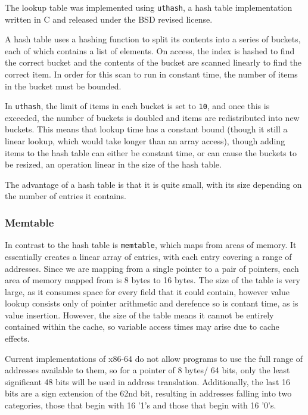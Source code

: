 The lookup table was implemented using \verb!uthash!, a hash table implementation written in C and released under the BSD revised license. 

A hash table uses a hashing function to split its contents into a series of buckets, each of which contains a list of elements.
On access, the index is hashed to find the correct bucket and the contents of the bucket are scanned linearly to find the correct item.
In order for this scan to run in constant time, the number of items in the bucket must be bounded.

In \verb!uthash!, the limit of items in each bucket is set to \verb!10!, and once this is exceeded, the number of buckets is doubled and items are redistributed into new buckets.
This means that lookup time has a constant bound (though it still a linear lookup, which would take longer than an array access), though adding items to the hash table can either be constant time, or can cause the buckets to be resized, an operation linear in the size of the hash table.

The advantage of a hash table is that it is quite small, with its size depending on the number of entries it contains.

\subsubsection{Memtable}

In contrast to the hash table is \verb!memtable!, which maps from areas of memory.
It essentially creates a linear array of entries, with each entry covering a range of addresses.
Since we are mapping from a single pointer to a pair of pointers, each area of memory mapped from is 8 bytes to 16 bytes.
The size of the table is very large, as it consumes space for every field that it could contain, however value lookup consists only of pointer arithmetic and derefence so is contant time, as is value insertion.
However, the size of the table means it cannot be entirely contained within the cache, so variable access times may arise due to cache effects.

Current implementations of x86-64 do not allow programs to use the full range of addresses available to them, so for a pointer of 8 bytes/ 64 bits, only the least significant 48 bits will be used in address translation.
Additionally, the last 16 bits are a sign extension of the 62nd bit, resulting in addresses falling into two categories, those that begin with 16 '1's and those that begin with 16 '0's.

